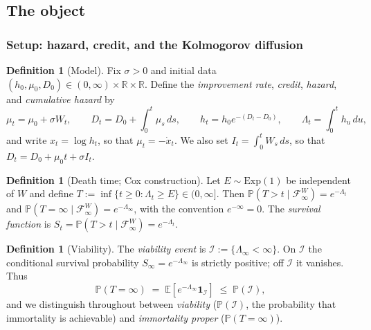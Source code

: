 \documentclass[11pt]{article}
\numberwithin{equation}{section}
\theoremstyle{plain}
\theoremstyle{definition}
\newtheorem{definition}[theorem]{Definition}
\theoremstyle{remark}
\newcommand{\E}{\mathbb{E}}
\newcommand{\PP}{\mathbb{P}}
\newcommand{\R}{\mathbb{R}}
\newcommand{\one}{\mathbf{1}}
\newcommand{\Imm}{\mathcal{I}}
\newcommand{\Fc}{\mathcal{F}}
\begin{document}
\subsection{The object}\label{gr1:sub:object}\label{tc:sub:model}\label{sh:sub:model}


\subsubsection{Setup: hazard, credit, and the Kolmogorov diffusion}
\label{sh:subsub:setup}

\begin{definition}[Model]\label{sh:def:model}
Fix $\sigma>0$ and initial data $(h_0,\mu_0,D_0)\in(0,\infty)\times\R\times\R$.
Define the \emph{improvement rate}, \emph{credit}, \emph{hazard}, and
\emph{cumulative hazard} by
\begin{equation}\label{sh:eq:model}
\mu_t=\mu_0+\sigma W_t,\qquad
D_t=D_0+\int_0^t\mu_s\,ds,\qquad
h_t=h_0e^{-(D_t-D_0)},\qquad
\Lambda_t=\int_0^t h_u\,du,
\end{equation}
and write $x_t=\log h_t$, so that $\mu_t=-\dot x_t$. We also set
$I_t=\int_0^t W_s\,ds$, so that $D_t=D_0+\mu_0t+\sigma I_t$.
\end{definition}

\begin{definition}[Death time; Cox construction]\label{sh:def:cox}
Let $E\sim\mathrm{Exp}(1)$ be independent of $W$ and define
$T:=\inf\{t\ge0:\Lambda_t\ge E\}\in(0,\infty]$. Then
$\PP(T>t\mid\Fc^W_\infty)=e^{-\Lambda_t}$ and
$\PP(T=\infty\mid\Fc^W_\infty)=e^{-\Lambda_\infty}$, with the convention
$e^{-\infty}=0$. The \emph{survival function} is
$S_t=\PP(T>t\mid\Fc^W_\infty)=e^{-\Lambda_t}$.
\end{definition}

\begin{definition}[Viability]\label{sh:def:viab}
The \emph{viability event} is $\Imm:=\{\Lambda_\infty<\infty\}$. On $\Imm$
the conditional survival probability $S_\infty=e^{-\Lambda_\infty}$ is
strictly positive; off $\Imm$ it vanishes. Thus
\begin{equation}\label{sh:eq:twotier}
\PP(T=\infty)\;=\;\E\!\left[e^{-\Lambda_\infty}\one_\Imm\right]
\;\le\;\PP(\Imm),
\end{equation}
and we distinguish throughout between \emph{viability} ($\PP(\Imm)$, the
probability that immortality is achievable) and \emph{immortality proper}
($\PP(T=\infty)$).
\end{definition}
\end{document}
